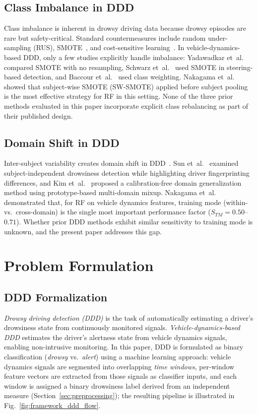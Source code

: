 \documentclass[lettersize,journal]{IEEEtran}
\begin{document}
\subsection{Class Imbalance in DDD}
Class imbalance is inherent in drowsy driving data because drowsy episodes are rare but safety-critical.
Standard countermeasures include random under-sampling (RUS), SMOTE~\cite{chawla2002}, and cost-sensitive learning~\cite{he2009}.
In vehicle-dynamics-based DDD, only a few studies explicitly handle imbalance: Yadawadkar et~al.~\cite{yadawadkar2018} compared SMOTE with no resampling, Schwarz et~al.~\cite{schwarz2019} used SMOTE in steering-based detection, and Baccour et~al.~\cite{baccour2022} used class weighting.
Nakagama et~al.~\cite{nakagama2026tiv} showed that subject-wise SMOTE (SW-SMOTE) applied before subject pooling is the most effective strategy for RF in this setting.
None of the three prior methods evaluated in this paper incorporate explicit class rebalancing as part of their published design.

\subsection{Domain Shift in DDD}
Inter-subject variability creates domain shift in DDD~\cite{pan2010,aravinth2025}.
Sun et~al.~\cite{sun2021} examined subject-independent drowsiness detection while highlighting driver fingerprinting differences, and Kim et~al.~\cite{kim2025} proposed a calibration-free domain generalization method using prototype-based multi-domain mixup.
Nakagama et~al.~\cite{nakagama2026tiv} demonstrated that, for RF on vehicle dynamics features, training mode (within- vs.\ cross-domain) is the single most important performance factor ($S_{TM} = 0.50$--$0.71$).
Whether prior DDD methods exhibit similar sensitivity to training mode is unknown, and the present paper addresses this gap.

\section{Problem Formulation}
\label{sec:formulation}

\subsection{DDD Formalization}
\emph{Drowsy driving detection (DDD)} is the task of automatically estimating a driver's drowsiness state from continuously monitored signals.
\emph{Vehicle-dynamics-based DDD} estimates the driver's alertness state from vehicle dynamics signals, enabling non-intrusive monitoring.
In this paper, DDD is formulated as binary classification (\emph{drowsy} vs.\ \emph{alert}) using a machine learning approach: vehicle dynamics signals are segmented into overlapping \emph{time windows}, per-window feature vectors are extracted from those signals as classifier inputs, and each window is assigned a binary drowsiness label derived from an independent measure (Section~\ref{sec:preprocessing}); the resulting pipeline is illustrated in Fig.~\ref{fig:framework_ddd_flow}.
\end{document}
